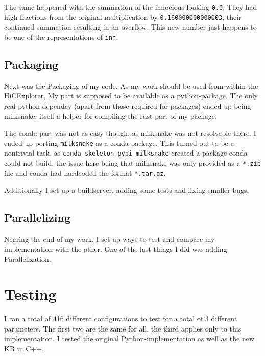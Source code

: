 The same happened with the summation of the innocious-looking \verb|0.0|. They
had high fractions from the original multiplication by
\verb|0.160000000000003|, their continued summation resulting in an overflow.
This new number just happens to be one of the representations of \verb|inf|.


\subsection{Packaging}


Next was the Packaging of my code. As my work should be used from within the
HiCExplorer, My part is supposed to be available as a python-package. The only
real python dependcy (apart from those required for packages) ended up being
milksnake, itself a helper for compiling the rust part of my package.

The conda-part was not as easy though, as milksnake was not resolvable there. I
ended up porting \verb|milksnake| as a conda package. This turned out to be a
nontrivial task, as \verb|conda skeleton pypi milksnake| created a package
conda could not build, the issue here being that milksnake was only provided as
a \verb|*.zip| file and conda had hardcoded the format \verb|*.tar.gz|.

Additionally I set up a buildserver, adding some tests and fixing smaller bugs.


\subsection{Parallelizing}


Nearing the end of my work, I set up ways to test and compare my implementation
with the other. One of the last things I did was adding Parallelization.



\section{Testing}\label{sec:testing}


I ran a total of 416 different configurations to test for a total of 3
different parameters. The first two are the same for all, the third applies
only to this implementation. I tested the original Python-implementation as
well as the new KR in C++.

